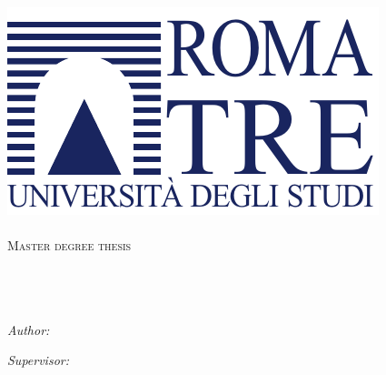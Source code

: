 \documentclass[
10pt, %
oneside, %
english, %
doublespacing, %
headsepline, %
]{MastersDoctoralThesis} %
\author{Salvati Danilo} %
\begin{document}
\frontmatter %

\pagestyle{plain} %


\begin{titlepage}
\begin{center}

\includegraphics{Logo}\\ %
\vspace{1cm}
\textsc{\LARGE \univname}\\[1.5cm] %
\textsc{\Large Master degree thesis}\\[0.5cm] %

\HRule \\[0.4cm] %
{\huge \bfseries \ttitle}\\[0.4cm] %
\HRule \\[1.5cm] %
 
\begin{minipage}{0.4\textwidth}
\begin{flushleft} \large
\emph{Author:}\\
\href{}{\authorname} %
\end{flushleft}
\end{minipage}
\begin{minipage}{0.4\textwidth}
\begin{flushright} \large
\emph{Supervisor:} \\
\href{}{\supname} %
\end{flushright}
\end{minipage}\\[3cm]
 

\end{center}
\end{titlepage}
\end{document}
